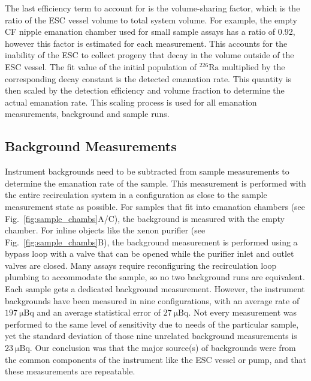 \documentclass[final,3p,times]{elsarticle}
\begin{document}
The last efficiency term to account for is the volume-sharing factor, which is the ratio of the ESC vessel volume to total system volume. 
For example, the empty CF nipple emanation chamber used for small sample assays has a ratio of 0.92, however this factor is estimated for each measurement.
This accounts for the inability of the ESC to collect  progeny that decay in the volume outside of the ESC vessel. 
The fit value of the initial population of $^{226}\text{Ra}$ multiplied by the corresponding decay constant is the detected emanation rate.
This quantity is then scaled by the detection efficiency and volume fraction to determine the actual emanation rate.
This scaling process is used for all emanation measurements, background and sample runs. 

\subsection{Background Measurements}
Instrument backgrounds need to be subtracted from sample measurements to determine the emanation rate of the sample. 
This measurement is performed with the entire recirculation system in a configuration as close to the sample measurement state as possible. 
For samples that fit into emanation chambers (see Fig.~\ref{fig:sample_chambs}A/C), the background is measured with the empty chamber. 
For inline objects like the xenon purifier (see Fig.~\ref{fig:sample_chambs}B), the background measurement is performed using a bypass loop with a valve that can be opened while the purifier inlet and outlet valves are closed. 
Many assays require reconfiguring the recirculation loop plumbing to accommodate the sample, so no two background runs are equivalent. Each sample gets a dedicated background measurement. 
However, the instrument backgrounds have been measured in nine configurations, with an average rate of $197~\mathrm{\mu Bq}$ and an average statistical error of $27~\mathrm{\mu Bq}$.
Not every measurement was performed to the same level of sensitivity due to needs of the particular sample, yet the standard deviation of those nine unrelated background measurements is $23~\mathrm{\mu Bq}$.
Our conclusion was that the major source(s) of backgrounds were from the common components of the instrument like the ESC vessel or pump, and that these measurements are repeatable.
\end{document}
